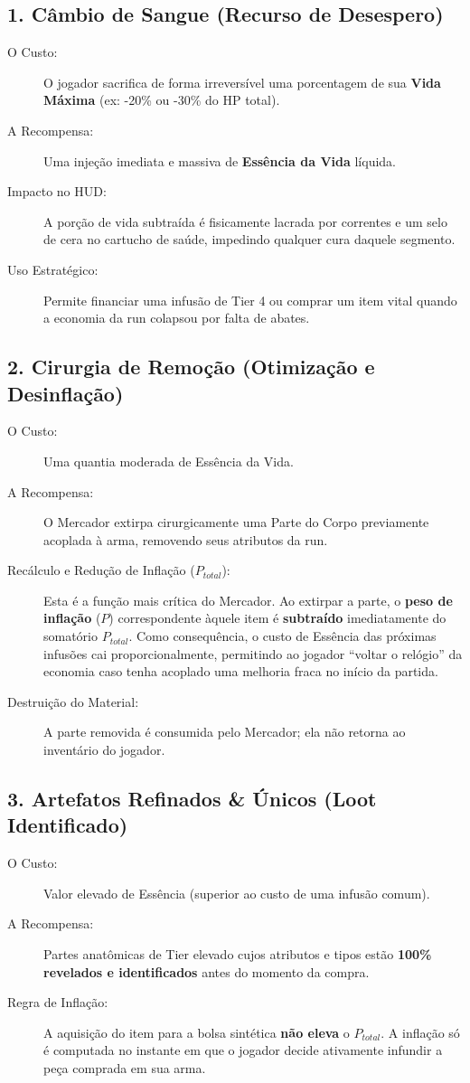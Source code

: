 \documentclass[a4paper,12pt]{report}
\begin{document}
\subsection{1. Câmbio de Sangue (Recurso de Desespero)}
\begin{description}
    \item[O Custo:] O jogador sacrifica de forma irreversível uma porcentagem de sua \textbf{Vida Máxima} (ex: -20\% ou -30\% do HP total).
    \item[A Recompensa:] Uma injeção imediata e massiva de \textbf{Essência da Vida} líquida.
    \item[Impacto no HUD:] A porção de vida subtraída é fisicamente lacrada por correntes e um selo de cera no cartucho de saúde, impedindo qualquer cura daquele segmento.
    \item[Uso Estratégico:] Permite financiar uma infusão de Tier 4 ou comprar um item vital quando a economia da run colapsou por falta de abates.
\end{description}

\subsection{2. Cirurgia de Remoção (Otimização e Desinflação)}
\begin{description}
    \item[O Custo:] Uma quantia moderada de Essência da Vida.
    \item[A Recompensa:] O Mercador extirpa cirurgicamente uma Parte do Corpo previamente acoplada à arma, removendo seus atributos da run.
    \item[Recálculo e Redução de Inflação ($P_{total}$):] Esta é a função mais crítica do Mercador. Ao extirpar a parte, o \textbf{peso de inflação} ($P$) correspondente àquele item é \textbf{subtraído} imediatamente do somatório $P_{total}$. Como consequência, o custo de Essência das próximas infusões cai proporcionalmente, permitindo ao jogador ``voltar o relógio'' da economia caso tenha acoplado uma melhoria fraca no início da partida.
    \item[Destruição do Material:] A parte removida é consumida pelo Mercador; ela não retorna ao inventário do jogador.
\end{description}

\subsection{3. Artefatos Refinados \& Únicos (Loot Identificado)}
\begin{description}
    \item[O Custo:] Valor elevado de Essência (superior ao custo de uma infusão comum).
    \item[A Recompensa:] Partes anatômicas de Tier elevado cujos atributos e tipos estão \textbf{100\% revelados e identificados} antes do momento da compra.
    \item[Regra de Inflação:] A aquisição do item para a bolsa sintética \textbf{não eleva} o $P_{total}$. A inflação só é computada no instante em que o jogador decide ativamente infundir a peça comprada em sua arma.
\end{description}
\end{document}
